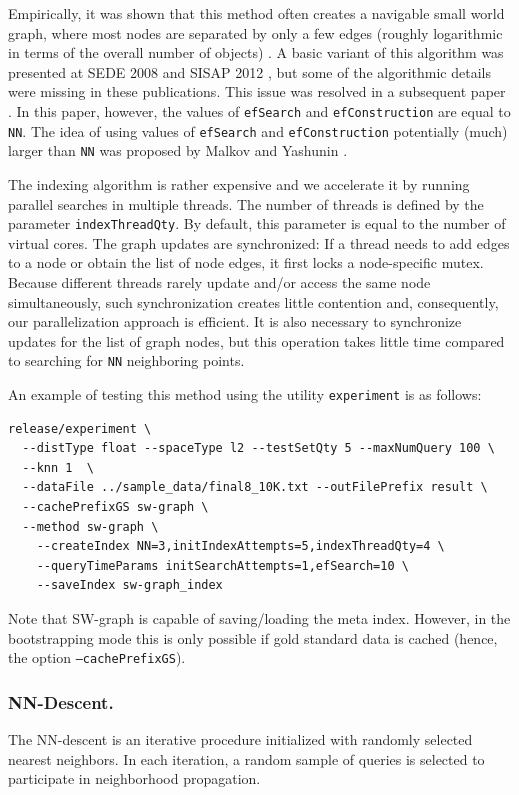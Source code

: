 \documentclass[runningheads,a4paper]{llncs}
\newcommand{\todonoteinline}[1]{\todo[color=red!40,inline,caption={TODO}]{#1}}
\newcommand{\ttt}[1]{\texttt{#1}}
\begin{document}
Empirically, it was shown that this method often creates a navigable small world graph, where most nodes are separated by only a few edges (roughly logarithmic in terms of the overall number of objects) \cite{malkov2012scalable}.
A basic variant of this algorithm was presented at SEDE 2008 and SISAP 2012 \cite{krylov2008metrized,malkov2012scalable},
but some of the algorithmic details were missing in these publications.
This issue was resolved in a subsequent paper \cite{malkov2014}.
In this paper, however, the values of \ttt{efSearch} and \ttt{efConstruction} are equal to \ttt{NN}.
The idea of using values of \ttt{efSearch} and \ttt{efConstruction} potentially (much) larger than \ttt{NN}
was proposed by Malkov and Yashunin \cite{Malkov2016}.

The indexing algorithm is rather expensive and we accelerate it by running parallel searches in multiple threads. The number of threads is defined by the parameter \ttt{indexThreadQty}. By default, this parameter is equal to the number of virtual cores.
The graph updates are synchronized: If a thread  needs to add edges to a node or obtain
the list of node edges, it first locks a node-specific mutex.
Because different threads rarely update and/or access the same node simultaneously,
such synchronization creates little contention and, consequently,
our parallelization approach is efficient.
It is also necessary to synchronize updates for the list of graph nodes, 
but this operation takes little time compared to searching for \ttt{NN} neighboring points.

An example of testing this method using the utility \texttt{experiment} is as follows:
{
\footnotesize
\begin{verbatim}
release/experiment \
  --distType float --spaceType l2 --testSetQty 5 --maxNumQuery 100 \
  --knn 1  \
  --dataFile ../sample_data/final8_10K.txt --outFilePrefix result \
  --cachePrefixGS sw-graph \
  --method sw-graph \
    --createIndex NN=3,initIndexAttempts=5,indexThreadQty=4 \
    --queryTimeParams initSearchAttempts=1,efSearch=10 \
    --saveIndex sw-graph_index
\end{verbatim}
}
Note that SW-graph is capable of saving/loading the meta index. However, in the bootstrapping
mode this is only possible if gold standard data is cached (hence, the option \ttt{--cachePrefixGS}).

\todonoteinline{Add HNSW and update the parameters table.}


\subsubsection{NN-Descent.} \label{SectionNNDescent}
The NN-descent is an iterative procedure initialized with randomly selected
nearest neighbors. In each iteration, a random sample of queries is selected
to participate in neighborhood propagation.
\end{document}
